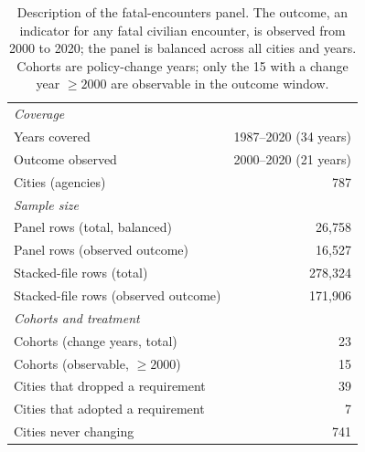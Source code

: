 \begin{table}[!htb]\centering
\caption{Description of the \textcite{payson2025residency} fatal-encounters panel. The outcome, an indicator for any fatal civilian encounter,
is observed from 2000 to 2020; the panel is balanced across all cities and years.
Cohorts are policy-change years; only the 15 with a change year $\geq 2000$ are
observable in the outcome window.}
\label{tab:data-description}
\begin{tabular}{lr}
\toprule
\multicolumn{2}{l}{\textit{Coverage}} \\
\quad Years covered & 1987--2020 (34 years) \\
\quad Outcome observed & 2000--2020 (21 years) \\
\quad Cities (agencies) & 787 \\
\midrule
\multicolumn{2}{l}{\textit{Sample size}} \\
\quad Panel rows (total, balanced) & 26,758 \\
\quad Panel rows (observed outcome) & 16,527 \\
\quad Stacked-file rows (total) & 278,324 \\
\quad Stacked-file rows (observed outcome) & 171,906 \\
\midrule
\multicolumn{2}{l}{\textit{Cohorts and treatment}} \\
\quad Cohorts (change years, total) & 23 \\
\quad Cohorts (observable, $\ge 2000$) & 15 \\
\quad Cities that dropped a requirement & 39 \\
\quad Cities that adopted a requirement & 7 \\
\quad Cities never changing & 741 \\
\bottomrule
\end{tabular}
\end{table}
